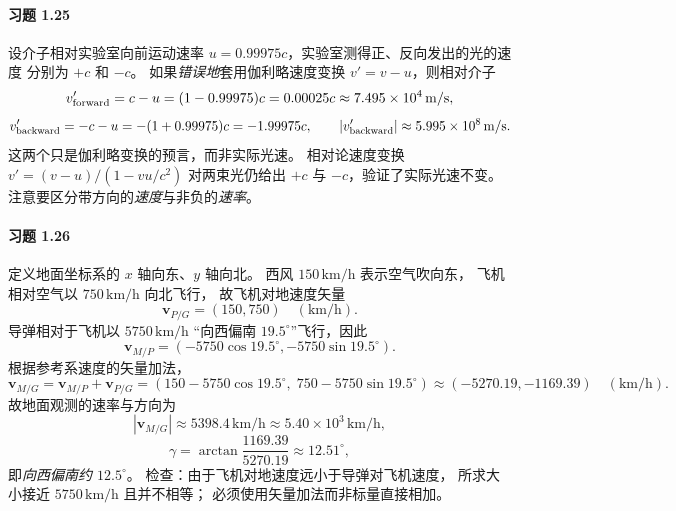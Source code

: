 \paragraph{习题 1.25}
设介子相对实验室向前运动速率
\(u=0.99975c\)，实验室测得正、反向发出的光的速度
分别为 \(+c\) 和 \(-c\)。
如果\emph{错误地}套用伽利略速度变换
\(v'=v-u\)，则相对介子
\[
 v'_{\rm forward}=c-u=(1-0.99975)c
 =0.00025c\approx7.495\times10^4\,\mathrm{m/s},
\]
\[
 v'_{\rm backward}=-c-u=-(1+0.99975)c
 =-1.99975c,
 \qquad
 |v'_{\rm backward}|\approx5.995\times10^8\,\mathrm{m/s}.
\]
这两个只是伽利略变换的预言，而非实际光速。
相对论速度变换
\(v'=(v-u)/(1-vu/c^2)\) 对两束光仍给出
\(+c\) 与 \(-c\)，验证了实际光速不变。
注意要区分带方向的\emph{速度}与非负的\emph{速率}。

\paragraph{习题 1.26}
定义地面坐标系的 \(x\) 轴向东、\(y\) 轴向北。
西风 \(150\,\mathrm{km/h}\) 表示空气吹向东，
飞机相对空气以 \(750\,\mathrm{km/h}\) 向北飞行，
故飞机对地速度矢量
\[
 \boldsymbol v_{P/G}=(150,750)\quad(\mathrm{km/h}).
\]
导弹相对于飞机以 \(5750\,\mathrm{km/h}\)
“向西偏南 \(19.5^\circ\)”飞行，因此
\[
 \boldsymbol v_{M/P}
 =(-5750\cos19.5^\circ,-5750\sin19.5^\circ).
\]
根据参考系速度的矢量加法，
\[
 \boldsymbol v_{M/G}
 =\boldsymbol v_{M/P}+\boldsymbol v_{P/G}
 =(150-5750\cos19.5^\circ,\;
  750-5750\sin19.5^\circ)
 \approx(-5270.19,-1169.39)\quad(\mathrm{km/h}).
\]
故地面观测的速率与方向为
\[
 |\boldsymbol v_{M/G}|
 \approx5398.4\,\mathrm{km/h}\approx5.40\times10^3\,\mathrm{km/h},
\]
\[
 \gamma=\arctan\frac{1169.39}{5270.19}
 \approx12.51^\circ,
\]
即\emph{向西偏南约 \(12.5^\circ\)}。
检查：由于飞机对地速度远小于导弹对飞机速度，
所求大小接近 \(5750\,\mathrm{km/h}\) 且并不相等；
必须使用矢量加法而非标量直接相加。
